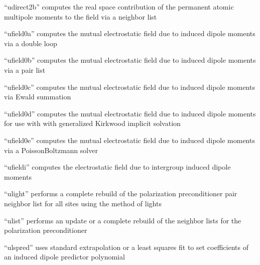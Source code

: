 \documentclass[letterpaper,11pt,english]{sphinxmanual}
\begin{document}
\sphinxAtStartPar
{}

\sphinxAtStartPar
“udirect2b” computes the real space contribution of the permanent atomic multipole moments to the field via a neighbor list

\sphinxAtStartPar
{}

\sphinxAtStartPar
“ufield0a” computes the mutual electrostatic field due to induced dipole moments via a double loop

\sphinxAtStartPar
{}

\sphinxAtStartPar
“ufield0b” computes the mutual electrostatic field due to induced dipole moments via a pair list

\sphinxAtStartPar
{}

\sphinxAtStartPar
“ufield0c” computes the mutual electrostatic field due to induced dipole moments via Ewald summation

\sphinxAtStartPar
{}

\sphinxAtStartPar
“ufield0d” computes the mutual electrostatic field due to induced dipole moments for use with with generalized Kirkwood implicit solvation

\sphinxAtStartPar
{}

\sphinxAtStartPar
“ufield0e” computes the mutual electrostatic field due to induced dipole moments via a Poisson\sphinxhyphen{}Boltzmann solver

\sphinxAtStartPar
{}

\sphinxAtStartPar
“ufieldi” computes the electrostatic field due to intergroup induced dipole moments

\sphinxAtStartPar
{}

\sphinxAtStartPar
“ulight” performs a complete rebuild of the polarization preconditioner pair neighbor list for all sites using the method of lights

\sphinxAtStartPar
{}

\sphinxAtStartPar
“ulist” performs an update or a complete rebuild of the neighbor lists for the polarization preconditioner

\sphinxAtStartPar
{}

\sphinxAtStartPar
“ulspred” uses standard extrapolation or a least squares fit to set coefficients of an induced dipole predictor polynomial
\end{document}
